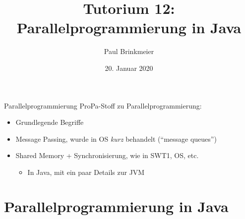 \documentclass{beamer}
\title{Tutorium 12: Parallelprogrammierung in Java}
\author{Paul Brinkmeier}
\institute{Tutorium Programmierparadigmen am KIT}
\date{20. Januar 2020}
\begin{document}
\begin{frame}
	\titlepage
\end{frame}

{
	\begin{frame}[plain]
	\end{frame}
}

\begin{frame}{Parallelprogrammierung}
	ProPa-Stoff zu Parallelprogrammierung:

	\begin{itemize}
		\item Grundlegende Begriffe
		\item Message Passing, wurde in OS \emph{kurz} behandelt (\enquote{message queues})
		\item Shared Memory + Synchronisierung, wie in SWT1, OS, etc.
		\begin{itemize}
			\item In Java, mit ein paar Details zur JVM
		\end{itemize}
	\end{itemize}
\end{frame}

\section{Parallelprogrammierung in Java}
\end{document}
